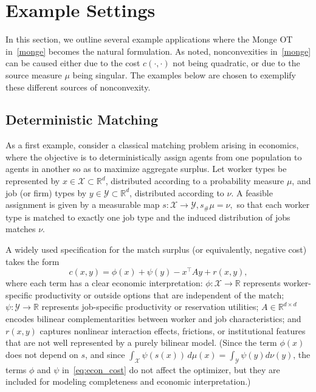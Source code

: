 \documentclass[12pt,leqno]{amsart}
\begin{document}
\section{Example Settings}

In this section, we outline several example applications where the Monge OT in~\eqref{monge} becomes the natural formulation. As noted, nonconvexities in~\eqref{monge} can be caused either due to the cost $c(\cdot,\cdot)$ not being quadratic, or due to the source measure $\mu$ being singular. The examples below are chosen to exemplify these different sources of nonconvexity. 

\subsection{Deterministic Matching}
\label{sec:econ_monge_example}

As a first example, consider a classical matching problem arising in economics, where the objective is to deterministically assign agents from one population to agents in another so as to maximize aggregate surplus. Let worker types be represented by $x \in \mathcal{X} \subset \mathbb R^d$, distributed according to a probability measure $\mu$, and job (or firm) types by $y \in \mathcal{Y} \subset \mathbb R^d$, distributed according to $\nu$. A feasible assignment is given by a measurable map
$s : \mathcal{X} \to \mathcal{Y}, s_\# \mu = \nu,$
so that each worker type is matched to exactly one job type and the induced distribution of jobs matches $\nu$.

A widely used specification for the match surplus (or equivalently, negative cost) takes the form
\begin{equation}
\label{eq:econ_cost}
c(x,y)
=
\phi(x)
+
\psi(y)
-
x^\top A y
+
r(x,y),
\end{equation}
where each term has a clear economic interpretation: $\phi:\mathcal{X} \to \mathbb R$ represents worker-specific productivity or outside options that are independent of the match; $\psi:\mathcal{Y} \to \mathbb R$ represents job-specific productivity or reservation utilities; $A \in \mathbb R^{d\times d}$ encodes bilinear complementarities between worker and job characteristics; and $r(x,y)$ captures nonlinear interaction effects, frictions, or institutional features that are not well represented by a purely bilinear model. (Since the term $\phi(x)$ does not depend on $s$, and since $\int_{\mathcal{X}} \psi(s(x))\, d\mu(x) = \int_{\mathcal{Y}} \psi(y)d\nu(y)$, the terms $\phi$ and $\psi$ in~\eqref{eq:econ_cost} do not affect the optimizer, but they are included for modeling completeness and economic interpretation.)
\end{document}
